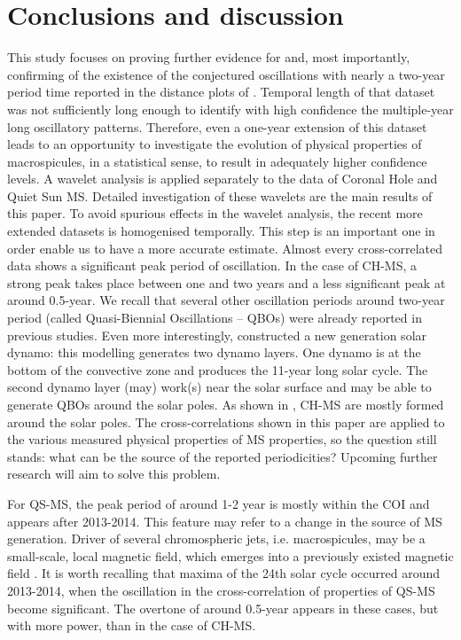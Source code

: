 \documentclass[final,authoryear,5p]{elsarticle}
\begin{document}
\section{Conclusions and discussion}
This study focuses on proving further evidence for and, most importantly, confirming of the existence of the conjectured oscillations with nearly a two-year period time reported in the distance plots of \cite{kiss2017}. Temporal length of that dataset was not sufficiently long enough to identify with high confidence the multiple-year long oscillatory patterns. Therefore, even a one-year extension of this dataset leads to an opportunity to investigate the evolution of physical properties of macrospicules, in a statistical sense, to result in adequately higher confidence levels. A wavelet analysis is applied separately to the data of Coronal Hole and Quiet Sun MS. Detailed investigation of these wavelets are the main results of this paper. To avoid spurious effects in the wavelet analysis, the recent more extended datasets is homogenised temporally. This step is an important one in order enable us to have a more accurate estimate. Almost every cross-correlated data shows a significant peak period of oscillation. In the case of CH-MS, a strong peak takes place between one and two years and a less significant peak at around 0.5-year. We recall that several other oscillation periods around two-year period (called Quasi-Biennial Oscillations -- QBOs) were already reported in previous studies. Even more interestingly, \cite{beaudoin2016} constructed a new generation solar dynamo: this modelling generates two dynamo layers. One dynamo is at the bottom of the convective zone and produces the 11-year long solar cycle. The second dynamo layer (may) work(s) near the solar surface and may be able to generate QBOs around the solar poles. As shown in \cite{kiss2017}, CH-MS are mostly formed around the solar poles. The cross-correlations shown in this paper are applied to the various measured physical properties of MS properties, so the question still stands: what can be the source of the reported periodicities? Upcoming further research will aim to solve this problem.

For QS-MS, the peak period of around 1-2 year is mostly within the COI and appears after 2013-2014. This feature may refer to a change in the source of MS generation. Driver of several chromospheric jets, i.e. macrospicules, may be a small-scale, local magnetic field, which emerges into a previously existed magnetic field \citep{sterling2000}. It is worth recalling that maxima of the 24th solar cycle occurred around 2013-2014, when the oscillation in the cross-correlation of properties of QS-MS become significant. The overtone of around 0.5-year appears in these cases, but with more power, than in the case of CH-MS.
\end{document}

